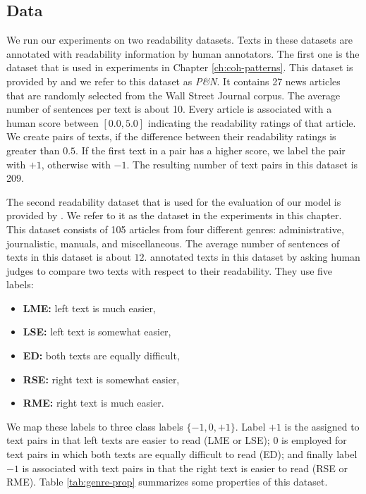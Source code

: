 \subsection{Data}
We run our experiments on two readability datasets. 
Texts in these datasets are annotated with readability information by human annotators.
The first one is the dataset that is used in experiments in Chapter \ref{ch:coh-patterns}. 
This dataset is provided by  and we refer to this dataset as \emph{P\&N}.  
It contains 27 news articles that are randomly selected from
the Wall Street Journal corpus. 
The average number of sentences per text is about 10.   
Every article is associated with a human score between $[0.0,5.0]$ indicating the readability ratings of that article. 
We create pairs of texts, if the difference between their readability ratings is greater than $0.5$. 
If the first text in a pair has a higher score, we label
the pair with $+1$, otherwise with $-1$. 
The resulting number of text pairs in this dataset is 209.

The second readability dataset that is used for the evaluation of our model is provided by .  
We refer to it as the \declercqds dataset in the experiments in this chapter.  
This dataset consists of 105 articles from four different genres: administrative, journalistic, manuals, and miscellaneous. 
The average number of sentences of texts in this dataset is about $12$. 
 annotated texts in this dataset by asking human judges to compare two texts with respect to their readability. 
They use five labels:

\begin{itemize}
  \item \textbf{LME:} left text is much easier,
  \item \textbf{LSE:} left text is somewhat easier, 
  \item \textbf{ED:} both texts are equally difficult,
  \item \textbf{RSE:} right text is somewhat easier,
  \item \textbf{RME:} right text is much easier.
\end{itemize}

We map these labels to three class labels $\lbrace -1, 0, +1 \rbrace$.  Label $+1$ is the assigned to text pairs in that left texts are easier to read (LME or LSE); 
$0$ is employed for text pairs in which both texts are equally difficult to read (ED); and finally label $-1$ is associated with text pairs in that the right text is easier to read (RSE or RME). 
Table \ref{tab:genre-prop} summarizes some properties of this dataset.


